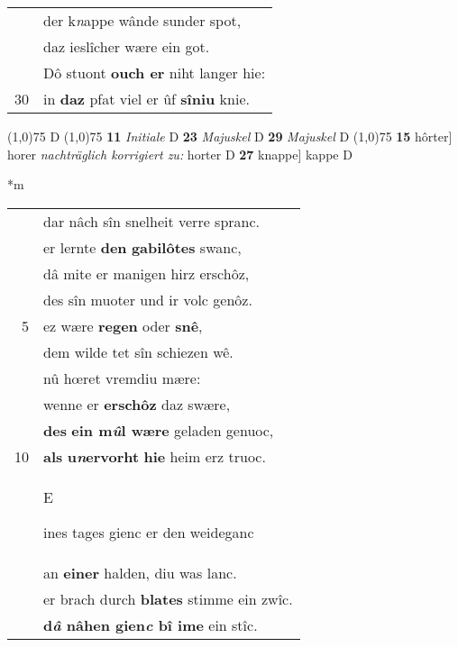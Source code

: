 \documentclass[8pt,a4paper,notitlepage]{article}
\begin{document}
\begin{table}[ht]
\begin{minipage}[t]{0.5\linewidth}
\begin{tabular}{rl}
 & der k\textit{n}appe wânde sunder spot,\\ 
 & daz ieslîcher wære ein got.\\ 
 & Dô stuont \textbf{ouch er} niht langer hie:\\ 
30 & in \textbf{daz} pfat viel er ûf \textbf{sîniu} knie.\\ 
\end{tabular}
\scriptsize
\line(1,0){75} \newline
D \newline
\line(1,0){75} \newline
\textbf{11} \textit{Initiale} D  \textbf{23} \textit{Majuskel} D  \textbf{29} \textit{Majuskel} D  \newline
\line(1,0){75} \newline
\textbf{15} hôrter] horer \textit{nachträglich korrigiert zu:} horter D \textbf{27} knappe] kappe D \newline
\end{minipage}
\hspace{0.5cm}
\begin{minipage}[t]{0.5\linewidth}
\small
\begin{center}*m
\end{center}
\begin{tabular}{rl}
 & dar nâch sîn snelheit verre spranc.\\ 
 & er lernte \textbf{den} \textbf{gabilôtes} swanc,\\ 
 & dâ mite er manigen hirz erschôz,\\ 
 & des sîn muoter und ir volc genôz.\\ 
5 & ez wære \textbf{regen} oder \textbf{snê},\\ 
 & dem wilde tet sîn schiezen wê.\\ 
 & nû hœret vremdiu mære:\\ 
 & wenne er \textbf{erschôz} daz swære,\\ 
 & \textbf{des} \textbf{ein m\textit{û}l wære} geladen genuoc,\\ 
10 & \textbf{als} \textbf{u\textit{n}ervorht} \textbf{hie} heim erz truoc.\\ 
 & \begin{large}E\end{large}ines tages gienc er den weideganc\\ 
 & an \textbf{einer} halden, diu was lanc.\\ 
 & er brach durch \textbf{blates} stimme ein zwîc.\\ 
 & \textbf{d\textit{â} nâhen gien\textit{c} bî ime} ein stîc.\\ 

\end{tabular}
\end{minipage}
\end{table}
\end{document}

